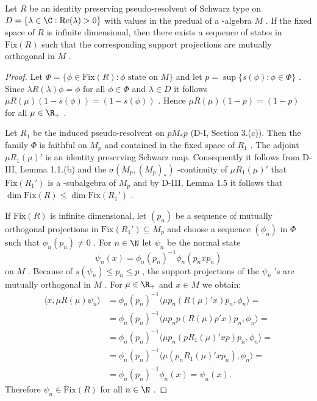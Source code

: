 \begin{lemma}\label{lem:d4-4.1}
Let $ R $  be an identity preserving pseudo-resolvent of Schwarz type on $ D = \{\lambda \in \C: \text{Re}(\lambda) > 0\} $  with values in the predual of a \WA-algebra $ M $ .
If the fixed space of $ R $  is infinite dimensional, then there exists a sequence of states in $ \text{Fix}(R) $  such that the corresponding support projections are mutually orthogonal in $ M $ .
\end{lemma}

\begin{proof}
Let $ \Phi = \{\phi \in \text{Fix}(R): \phi \text{ state on } M\} $  and let $ p = \sup\{s(\phi): \phi \in \Phi\} $ .
Since $ \lambda R(\lambda)\phi = \phi $  for all $ \phi \in \Phi $  and $ \lambda \in D $  it follows $ \mu R(\mu)(1-s(\phi)) = (1-s(\phi)) $ .
Hence $ \mu R(\mu)(1-p) = (1-p) $  for all $ \mu \in \R_{+} $ .

Let $ R_{1} $  be the induced pseudo-resolvent on $ pM_{*}p $  (D-I, Section 3.(c)).
Then the family $ \Phi $  is faithful on $ M_{p} $  and contained in the fixed space of $ R_{1} $ .
The adjoint $ \mu R_{1}(\mu)' $  is an identity preserving Schwarz map.
Consequently it follows from D-III, Lemma 1.1.(b) and the $ \sigma(M_{p},(M_{p})_{*}) $ -continuity of $ \mu R_{1}(\mu)' $  that $ \text{Fix}(R_{1}') $  is a \WA-subalgebra of $ M_{p} $  and by D-III, Lemma 1.5 it follows that $ \dim \text{Fix}(R) \leq \dim \text{Fix}(R_{1}') $ .

If $ \text{Fix}(R) $  is infinite dimensional, let $ (p_{n}) $  be a sequence of mutually orthogonal projections in $ \text{Fix}(R_{1}') \subseteq M_{p} $  and choose a sequence $ (\phi_{n}) $  in $ \Phi $  such that $ \phi_{n}(p_{n}) \neq 0 $ .
For $ n \in \N $  let $ \psi_{n} $  be the normal state
\[
\psi_{n}(x) = \phi_{n}(p_{n})^{-1}\phi_{n}(p_{n}xp_{n})
\]
on $ M $ .
Because of $ s(\psi_{n}) \leq p_{n} \leq p $ , the support projections of the $ \psi_{n} $ 's are mutually orthogonal in $ M $ .
For $ \mu \in \R_{+} $  and $ x \in M $  we obtain:
\[
\begin{aligned}
\langle x,\mu R(\mu)\psi_{n}\rangle &= \phi_{n}(p_{n})^{-1}\langle\mu p_{n}(R(\mu)'x)p_{n},\phi_{n}\rangle = \\
&= \phi_{n}(p_{n})^{-1}\langle\mu p_{n}p(R(\mu)p'x)p_{n},\phi_{n}\rangle = \\
&= \phi_{n}(p_{n})^{-1}\langle\mu p_{n}(pR_{1}(\mu)'xp)p_{n},\phi_{n}\rangle = \\
&= \phi_{n}(p_{n})^{-1}\langle\mu(p_{n}R_{1}(\mu)'xp_{n}),\phi_{n}\rangle = \\
&= \phi_{n}(p_{n})^{-1}\phi_{n}(x) = \psi_{n}(x).
\end{aligned}
\]
Therefore $ \psi_{n} \in \text{Fix}(R) $  for all $ n \in \N $ .
\end{proof}



